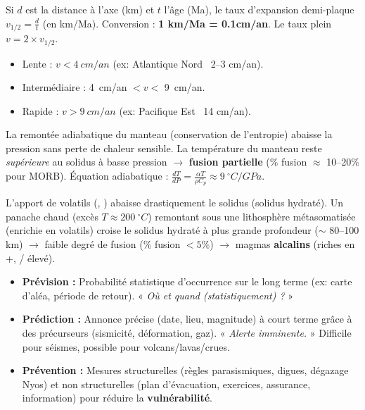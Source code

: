 \documentclass[11pt]{article}
\newcounter{popsec}
\newcounter{popsub}
\newcommand{\courssub}[1]{%
  \stepcounter{popsub}%
  \par\vspace{9pt}\noindent{\popxbold\fontsize{11.5}{13}\selectfont\color{popink}{\color{poporange}\thepopsec.\thepopsub}\hspace{6pt}#1}\par\nopagebreak\vspace{4pt}
}
\begin{document}
\courssub{Ressources à mobiliser}
\begin{propriete}
Si $d$ est la distance à l'axe (km) et $t$ l'âge (Ma), le taux d'expansion demi-plaque $v_{1/2} = \frac{d}{t}$ (en km/Ma). Conversion : \textbf{1 km/Ma = 0.1cm/an}. Le taux plein $v = 2 \times v_{1/2}$.
\begin{itemize}
    \item Lente : $v < \SI{4}{cm/an}$ (ex: Atlantique Nord ~2--3 cm/an).
    \item Intermédiaire : \SI{4}{cm/an} $< v <$ \SI{9}{cm/an}.
    \item Rapide : $v > \SI{9}{cm/an}$ (ex: Pacifique Est ~14 cm/an).
\end{itemize}
\end{propriete}

\begin{propriete}
La remontée adiabatique du manteau (conservation de l'entropie) abaisse la pression sans perte de chaleur sensible. La température du manteau reste \emph{supérieure} au solidus à basse pression $\rightarrow$ \textbf{fusion partielle} (\% fusion $\approx$ 10--20\% pour MORB). Équation adiabatique : $\frac{dT}{dP} = \frac{\alpha T}{\rho C_p} \approx \SI{9}{^\circ C/GPa}$.
\end{propriete}

\begin{propriete}
L'apport de volatils (, ) abaisse drastiquement le solidus (solidus hydraté). Un panache chaud (excès $T \approx \SI{200}{^\circ C}$) remontant sous une lithosphère métasomatisée (enrichie en volatils) croise le solidus hydraté à plus grande profondeur ($\sim$ 80--100 km) $\rightarrow$ faible degré de fusion (\% fusion $< 5\%$) $\rightarrow$ magmas \textbf{alcalins} (riches en +, / élevé).
\end{propriete}

\begin{definition}
\begin{itemize}
    \item \textbf{Prévision :} Probabilité statistique d'occurrence sur le long terme (ex: carte d'aléa, période de retour). « \emph{Où et quand (statistiquement) ?} »
    \item \textbf{Prédiction :} Annonce précise (date, lieu, magnitude) à court terme grâce à des précurseurs (sismicité, déformation, gaz). « \emph{Alerte imminente.} » Difficile pour séismes, possible pour volcans/lavas/crues.
    \item \textbf{Prévention :} Mesures structurelles (règles parasismiques, digues, dégazage Nyos) et non structurelles (plan d'évacuation, exercices, assurance, information) pour réduire la \textbf{vulnérabilité}.
\end{itemize}
\end{definition}
\end{document}
